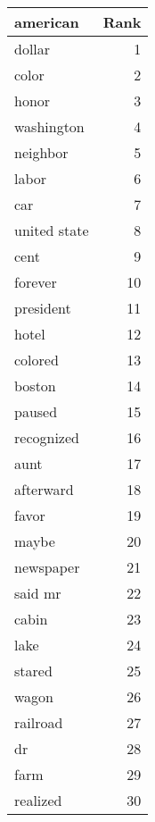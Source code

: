 \begin{table}
\label{tab:american_terms}
\begin{tabular}{lr}
\toprule
american & Rank \\
\midrule
dollar & 1 \\
color & 2 \\
honor & 3 \\
washington & 4 \\
neighbor & 5 \\
labor & 6 \\
car & 7 \\
united state & 8 \\
cent & 9 \\
forever & 10 \\
president & 11 \\
hotel & 12 \\
colored & 13 \\
boston & 14 \\
paused & 15 \\
recognized & 16 \\
aunt & 17 \\
afterward & 18 \\
favor & 19 \\
maybe & 20 \\
newspaper & 21 \\
said mr & 22 \\
cabin & 23 \\
lake & 24 \\
stared & 25 \\
wagon & 26 \\
railroad & 27 \\
dr & 28 \\
farm & 29 \\
realized & 30 \\
\bottomrule
\end{tabular}
\end{table}
